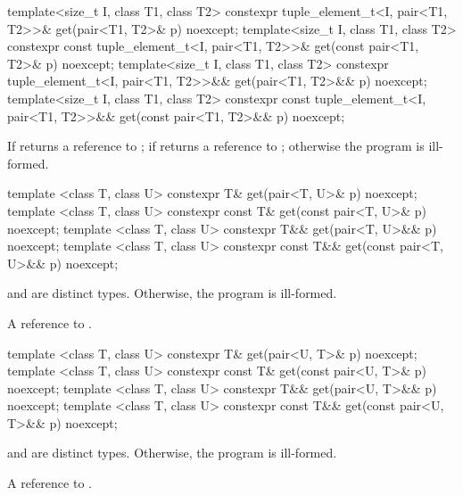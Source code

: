 %
\begin{itemdecl}
template<size_t I, class T1, class T2>
  constexpr tuple_element_t<I, pair<T1, T2>>&
    get(pair<T1, T2>& p) noexcept;
template<size_t I, class T1, class T2>
  constexpr const tuple_element_t<I, pair<T1, T2>>&
    get(const pair<T1, T2>& p) noexcept;
template<size_t I, class T1, class T2>
  constexpr tuple_element_t<I, pair<T1, T2>>&&
    get(pair<T1, T2>&& p) noexcept;
template<size_t I, class T1, class T2>
  constexpr const tuple_element_t<I, pair<T1, T2>>&&
    get(const pair<T1, T2>&& p) noexcept;
\end{itemdecl}
\begin{itemdescr}

\pnum
\returns If  returns a reference to ;
if  returns a reference to ;
otherwise the program is ill-formed.
\end{itemdescr}

%
\begin{itemdecl}
template <class T, class U>
  constexpr T& get(pair<T, U>& p) noexcept;
template <class T, class U>
  constexpr const T& get(const pair<T, U>& p) noexcept;
template <class T, class U>
  constexpr T&& get(pair<T, U>&& p) noexcept;
template <class T, class U>
  constexpr const T&& get(const pair<T, U>&& p) noexcept;
\end{itemdecl}
\begin{itemdescr}
\pnum
\requires {} and  are distinct types. Otherwise, the program is ill-formed.

\pnum
\returns A reference to .
\end{itemdescr}

%
\begin{itemdecl}
template <class T, class U>
  constexpr T& get(pair<U, T>& p) noexcept;
template <class T, class U>
  constexpr const T& get(const pair<U, T>& p) noexcept;
template <class T, class U>
  constexpr T&& get(pair<U, T>&& p) noexcept;
template <class T, class U>
  constexpr const T&& get(const pair<U, T>&& p) noexcept;
\end{itemdecl}
\begin{itemdescr}

\pnum
\requires {} and  are distinct types. Otherwise, the program is ill-formed.

\pnum
\returns A reference to .
\end{itemdescr}

